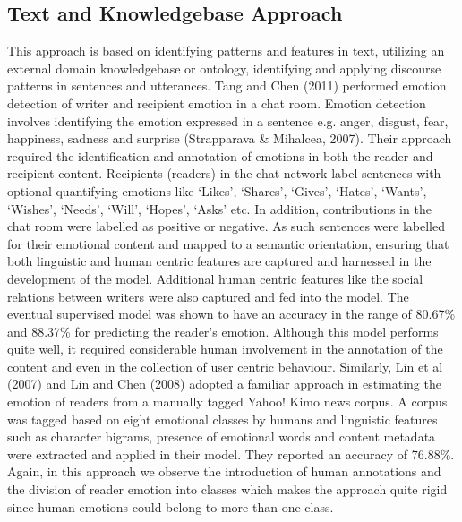 \subsection{Text and Knowledgebase Approach}
This approach is based on identifying patterns and features in text, utilizing an external domain knowledgebase or ontology, identifying and applying discourse patterns in sentences and utterances. Tang and Chen (2011) performed emotion detection of writer and recipient emotion in a chat room. Emotion detection involves identifying the emotion expressed in a sentence e.g. anger, disgust, fear, happiness, sadness and surprise (Strapparava \& Mihalcea, 2007). Their approach required the identification and annotation of emotions in both the reader and recipient content. Recipients (readers) in the chat network label sentences with optional quantifying emotions like `Likes', `Shares', `Gives', `Hates', `Wants', `Wishes', `Needs', `Will', `Hopes', `Asks' etc. In addition, contributions in the chat room were labelled as positive or negative. As such sentences were labelled for their emotional content and mapped to a semantic orientation, ensuring that both linguistic and human centric features are captured and harnessed in the development of the model. Additional human centric features like the social relations between writers were also captured and fed into the model. The eventual supervised model was shown to have an accuracy in the range of 80.67\% and 88.37\% for predicting the reader's emotion. Although this model performs quite well, it required considerable human involvement in the annotation of the content and even in the collection of user centric behaviour. Similarly, Lin et al (2007) and Lin and Chen (2008) adopted a familiar approach in estimating the emotion of readers from a manually tagged Yahoo! Kimo news corpus. A corpus was tagged based on eight emotional classes by humans and linguistic features such as character bigrams, presence of emotional words and content metadata were extracted and applied in their model. They reported an accuracy of 76.88\%. Again, in this approach we observe the introduction of human annotations and the division of reader emotion into classes which makes the approach quite rigid since human emotions could belong to more than one class.


